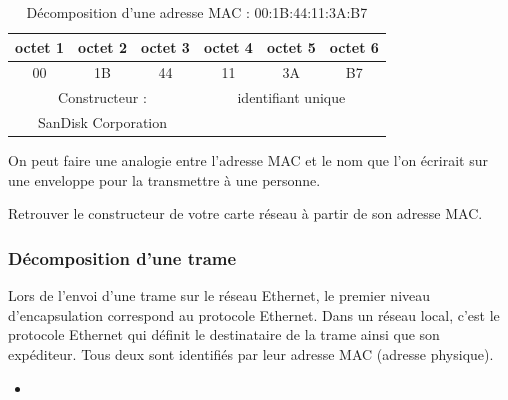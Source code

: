 \begin{table}[h!t]
\centering
  \begin{tabular}{ccc|ccc}
    octet 1 & octet 2 & octet 3 & octet 4 & octet 5 & octet 6\\
    \hline
    00      & 1B    &     44    & 11      &3A       &B7\\\hline
    \multicolumn{3}{c|}{Constructeur : }&\multicolumn{3}{c}{identifiant unique}\\
    \multicolumn{3}{c|}{SanDisk Corporation}&\multicolumn{3}{c}{}

  \end{tabular}
  \caption{Décomposition d'une adresse MAC : 00:1B:44:11:3A:B7}
  \label{tab:macExample}
\end{table}

On peut faire une analogie entre l'adresse MAC et le nom que l'on écrirait sur une enveloppe pour la transmettre à une personne.

\begin{UPSTIactivite}
  Retrouver le constructeur de votre carte réseau à partir de son adresse MAC.
\end{UPSTIactivite}

\subsubsection{Décomposition d'une trame}

Lors de l'envoi d'une trame sur le réseau Ethernet, le premier niveau d'encapsulation correspond au protocole Ethernet. Dans un réseau local, c'est le protocole Ethernet qui définit le destinataire de la trame ainsi que son expéditeur. Tous deux sont identifiés par leur adresse MAC (adresse physique).
\begin{itemize}
  \item
\end{itemize}

